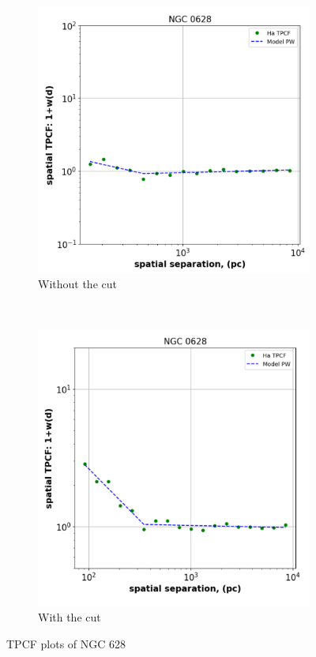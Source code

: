 \documentclass[12pt]{report}
\begin{document}
\begin{figure}[H]
    \centering
    \begin{subfigure}{0.45\textwidth}
        \centering
        \includegraphics[scale = 0.5]{image1.png}
        \caption{Without the cut}
        \label{fig:tpcf_without_cut}
    \end{subfigure}
    ~
    \begin{subfigure}{0.45\textwidth}
        \centering
        \includegraphics[scale = 0.5]{image2.png}
        \caption{With the cut}
        \label{fig:tpcf_with_cut}
    \end{subfigure}
    \caption{TPCF plots of NGC 628}
\end{figure}
\end{document}
